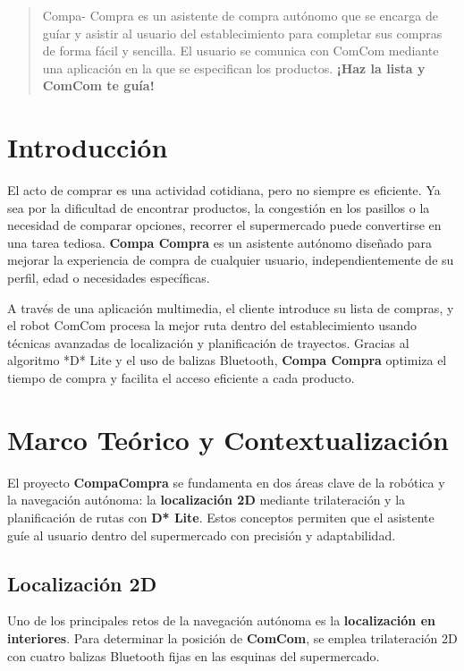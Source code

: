 \documentclass[a4paper,12pt]{article}
\begin{document}
\tableofcontents

\begin{abstract}
Compa- Compra es un asistente de compra autónomo que se encarga de guíar y asistir al usuario del establecimiento para completar sus compras de forma fácil y sencilla. El usuario se comunica con ComCom mediante una aplicación en la que se especifican los productos.
\textbf{¡Haz la lista y ComCom te guía!}
\end{abstract}

\section{Introducción}
El acto de comprar es una actividad cotidiana, pero no siempre es eficiente. 
Ya sea por la dificultad de encontrar productos, la congestión en los 
pasillos o la necesidad de comparar opciones, recorrer el supermercado 
puede convertirse en una tarea tediosa. \textbf{ Compa Compra } es un asistente 
autónomo diseñado para mejorar la experiencia de compra de cualquier usuario, 
independientemente de su perfil, edad o necesidades específicas.  

A través de una aplicación multimedia, el cliente introduce su lista de 
compras, y el robot ComCom procesa la mejor ruta dentro del establecimiento 
usando técnicas avanzadas de localización y planificación de trayectos. 
Gracias al algoritmo *D* Lite y el uso de balizas Bluetooth, \textbf{ Compa Compra } 
optimiza el tiempo de compra y facilita el acceso eficiente a cada producto.  

\section{Marco Teórico y Contextualización}

El proyecto \textbf{CompaCompra} se fundamenta en dos áreas clave de la robótica y la navegación autónoma: la \textbf{localización 2D} mediante trilateración y la planificación de rutas con \textbf{D* Lite}. Estos conceptos permiten que el asistente guíe al usuario dentro del supermercado con precisión y adaptabilidad.

\subsection{Localización 2D}
Uno de los principales retos de la navegación autónoma es la \textbf{localización en interiores}. Para determinar la posición de \textbf{ComCom}, se emplea trilateración 2D con cuatro balizas Bluetooth fijas en las esquinas del supermercado.
\end{document}
